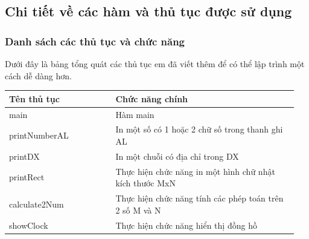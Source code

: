 \documentclass[12pt, final]{article}
\begin{document}
\subsection{Chi tiết về các hàm và thủ tục được sử dụng}
\subsubsection{Danh sách các thủ tục và chức năng}
Dưới đây là bảng tổng quát các thủ tục em đã viết thêm để có thể lập trình một cách dễ dàng hơn.

\begin{table}[H]
\centering
\begin{tabular}{|p{0.35\linewidth} | p{0.6\linewidth}|}
\hline
\textbf{Tên thủ tục}   & \textbf{Chức năng chính}  \\
\hline
main          & Hàm main                                             \\
\hline
printNumberAL & In một số có 1 hoặc 2 chữ số trong thanh ghi AL         \\
\hline
printDX       & In một chuỗi có địa chỉ trong DX                        \\
\hline
printRect     & Thực hiện chức năng in một hình chữ nhật kích thước MxN \\
\hline
calculate2Num & Thực hiện chức năng tính các phép toán trên 2 số M và N \\
\hline
showClock & Thực hiện chức năng hiển thị đồng hồ \\
\hline
\end{tabular}
\end{table}
\end{document}
